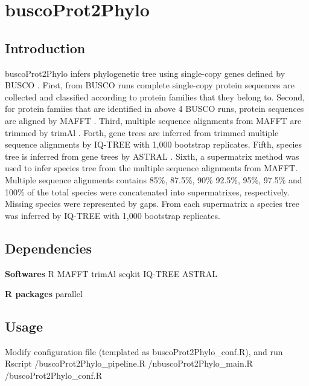 \documentclass[11pt]{article}
\begin{document}
\begin{sloppypar}
\section{buscoProt2Phylo}
\subsection{Introduction}
buscoProt2Phylo infers phylogenetic tree using single-copy genes defined by BUSCO \parencite{simao2015busco}. 
First, from BUSCO runs complete single-copy protein sequences are collected and classified according to protein families that they belong to. 
Second, for protein famiies that are identified in above 4 BUSCO runs, protein sequences are aligned by MAFFT \parencite{katoh2002mafft}. 
Third, multiple sequence alignments from MAFFT are trimmed by trimAl \parencite{capella2009trimal}. 
Forth, gene trees are inferred from trimmed multiple sequence alignments by IQ-TREE \parencite{minh2020iq} with 1,000 bootstrap replicates. 
Fifth, species tree is inferred from gene trees by ASTRAL \parencite{zhang2018astral}. 
Sixth, a supermatrix method was used to infer species tree from the multiple sequence alignments from MAFFT. 
Multiple sequence alignments contains 85\%, 87.5\%, 90\% 92.5\%, 95\%, 97.5\% and 100\% of the total species were concatenated into supermatrixes, respectively. 
Missing species were represented by gaps. 
From each supermatrix a species tree was inferred by IQ-TREE \parencite{minh2020iq} with 1,000 bootstrap replicates. 
\subsection{Dependencies}
\textbf{Softwares} \newline
R \newline
MAFFT \newline
trimAl \newline
seqkit \newline
IQ-TREE \newline
ASTRAL \newline
\par
\textbf{R packages} \newline
parallel \newline
\par
\subsection{Usage}
Modify configuration file (templated as buscoProt2Phylo\_conf.R), and run \newline
Rscript /buscoProt2Phylo\_pipeline.R /nbuscoProt2Phylo\_main.R /buscoProt2Phylo\_conf.R


\end{sloppypar}
\end{document}

